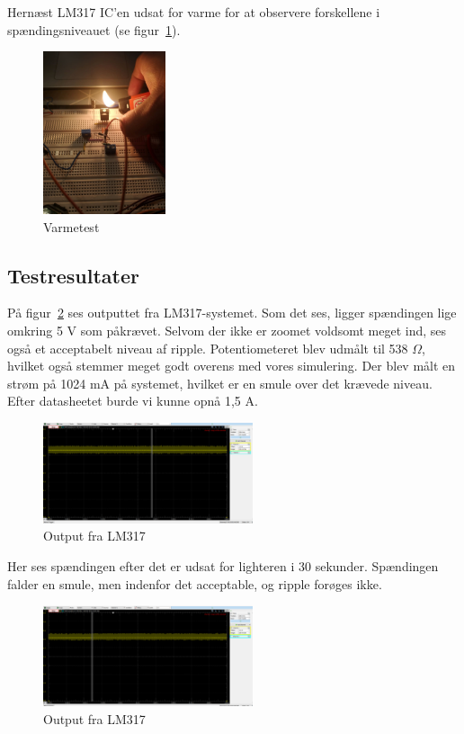 Hernæst LM317 IC’en udsat for varme for at observere forskellene i spændingsniveauet (se figur~\ref{fig:varme}).

\begin{figure}[h]
  \centering
  \includegraphics[width=0.32\textwidth]{varme.jpg}
  \caption{Varmetest}
  \label{fig:varme}
\end{figure}
\clearpage
\subsection{Testresultater}
\label{sec:testresultater}

På figur~\ref{fig:osc1} ses outputtet fra LM317-systemet. Som det ses, ligger spændingen lige omkring 5 V som påkrævet. Selvom der ikke er zoomet voldsomt meget ind, ses også et acceptabelt niveau af ripple. Potentiometeret blev udmålt til 538 $\Omega$, hvilket også stemmer meget godt overens med vores simulering. Der blev målt en strøm på 1024 mA på systemet, hvilket er en smule over det krævede niveau. Efter datasheetet burde vi kunne opnå 1,5 A.

\begin{figure}[h]
  \centering
  \includegraphics[width=0.55\textwidth]{osc1.png}
  \caption{Output fra LM317}
  \label{fig:osc1}
\end{figure}


Her ses spændingen efter det er udsat for lighteren i 30 sekunder. Spændingen falder en smule, men indenfor det acceptable, og ripple forøges ikke. 

\begin{figure}[h]
  \centering
  \includegraphics[width=0.55\textwidth]{osc2.png}
  \caption{Output fra LM317}
  \label{fig:osc2}
\end{figure}

